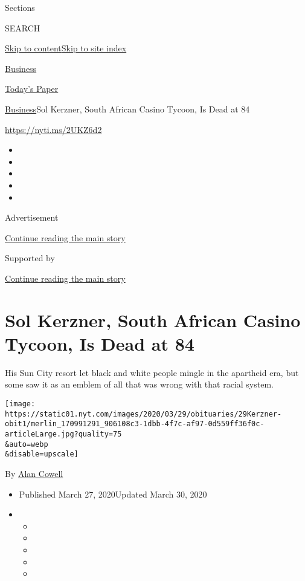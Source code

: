 Sections

SEARCH

\protect\hyperlink{site-content}{Skip to
content}\protect\hyperlink{site-index}{Skip to site index}

\href{https://www.nytimes.com/section/business}{Business}

\href{https://myaccount.nytimes.com/auth/login?response_type=cookie\&client_id=vi}{}

\href{https://www.nytimes.com/section/todayspaper}{Today's Paper}

\href{/section/business}{Business}\textbar{}Sol Kerzner, South African
Casino Tycoon, Is Dead at 84

\url{https://nyti.ms/2UKZ6d2}

\begin{itemize}
\item
\item
\item
\item
\item
\end{itemize}

Advertisement

\protect\hyperlink{after-top}{Continue reading the main story}

Supported by

\protect\hyperlink{after-sponsor}{Continue reading the main story}

\hypertarget{sol-kerzner-south-african-casino-tycoon-is-dead-at-84}{%
\section{Sol Kerzner, South African Casino Tycoon, Is Dead at
84}\label{sol-kerzner-south-african-casino-tycoon-is-dead-at-84}}

His Sun City resort let black and white people mingle in the apartheid
era, but some saw it as an emblem of all that was wrong with that racial
system.

\texttt{[image: https://static01.nyt.com/images/2020/03/29/obituaries/29Kerzner-obit1/merlin\_170991291\_906108c3-1dbb-4f7c-af97-0d559ff36f0c-articleLarge.jpg?quality=75\\\&auto=webp\\\&disable=upscale]}

By \href{https://www.nytimes.com/by/alan-cowell}{Alan Cowell}

\begin{itemize}
\item
  Published March 27, 2020Updated March 30, 2020
\item
  \begin{itemize}
  \item
  \item
  \item
  \item
  \item
  \end{itemize}
\end{itemize}

